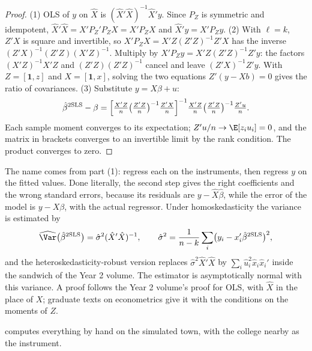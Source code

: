 \begin{proof}
(1) OLS of $y$ on $\hat X$ is $(\hat X'\hat X)^{-1}\hat X' y$. Since $P_Z$ is
symmetric and idempotent, $\hat X'\hat X = X'P_Z'P_Z X = X'P_Z X$ and $\hat X' y =
X'P_Z y$.
(2) With $\ell = k$, $Z'X$ is square and invertible, so
$X'P_Z X = X'Z(Z'Z)^{-1}Z'X$ has the inverse $(Z'X)^{-1}(Z'Z)(X'Z)^{-1}$.
Multiply by $X'P_Z y = X'Z(Z'Z)^{-1}Z'y$: the factors $(X'Z)^{-1}X'Z$ and
$(Z'Z)(Z'Z)^{-1}$ cancel and leave $(Z'X)^{-1}Z'y$. With $Z = [\mathbf 1, z]$
and $X = [\mathbf 1, x]$, solving the two equations $Z'(y - Xb) = 0$ gives the
ratio of covariances.
(3) Substitute $y = X\beta + u$:
\[
  \hat\beta^{\mathrm{2SLS}} - \beta = \Bigl[\tfrac{X'Z}{n}\bigl(\tfrac{Z'Z}{n}\bigr)^{-1}\tfrac{Z'X}{n}\Bigr]^{-1}
  \tfrac{X'Z}{n}\bigl(\tfrac{Z'Z}{n}\bigr)^{-1}\tfrac{Z'u}{n}.
\]
Each sample moment converges to its expectation; $Z'u/n \to \E[z_i u_i] = 0$,
and the matrix in brackets converges to an invertible limit by the rank
condition. The product converges to zero.
\end{proof}

The name comes from part (1): regress each  on the
instruments, then regress $y$ on the fitted values. Done literally, the second
step gives the right coefficients and the wrong standard errors, because its
residuals are $y - \hat X\hat\beta$, while the error of the model is $y -
X\beta$, with the actual regressor. Under homoskedasticity the variance is
estimated by
\[
  \widehat{\Var}\bigl(\hat\beta^{\mathrm{2SLS}}\bigr) = \hat\sigma^2 (\hat X'\hat X)^{-1},
  \qquad \hat\sigma^2 = \frac{1}{n - k}\sum_i \bigl(y_i - x_i'\hat\beta^{\mathrm{2SLS}}\bigr)^2,
\]
and the heteroskedasticity-robust version replaces $\hat\sigma^2 \hat X'\hat X$
by $\sum_i \hat u_i^2 \hat x_i \hat x_i'$ inside the sandwich of the Year 2
volume. The estimator is asymptotically normal with this variance.
\admitted
A proof follows the Year 2 volume's proof for OLS, with $\hat X$ in the place
of $X$; graduate texts on econometrics give it with the conditions on the
moments of $Z$.

 computes everything by hand on the
simulated town, with the college nearby as the instrument.

\label{lst:b3:instrumental-variables:tsls}

